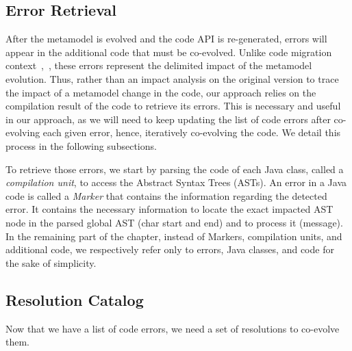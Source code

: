 \subsection{Error Retrieval}
\label{errorretrieving}

After the metamodel is evolved and the code API is re-generated, errors will appear in the additional code that must be co-evolved. Unlike code migration context~\cite{9079197},~\cite{henkel2005catchup}, these errors represent the delimited impact of the metamodel evolution. Thus, rather than an impact analysis on the original version to trace the impact of a metamodel change in the code, our approach relies on the compilation result of the code to retrieve its errors. 
This is necessary and useful in our approach, as we will need to keep updating the list of code errors after co-evolving each given error, hence, iteratively co-evolving the code. We detail this process in the following subsections.

To retrieve those errors, we start by parsing the code of each Java class, called a \emph{compilation unit}, to access the Abstract Syntax Trees (ASTs). An error in a Java code is called a \emph{Marker} that contains the information regarding the detected error. It contains the necessary information to locate the exact impacted AST node in the parsed global AST (\ie char start and end) and  to process it (\ie message).
In the remaining part of the chapter, instead of Markers, compilation units, and additional code, we respectively refer only to errors, Java classes, and code for the sake of simplicity.  

\subsection{Resolution Catalog}

Now that we have a list of code errors, we need a set of resolutions to co-evolve them.


